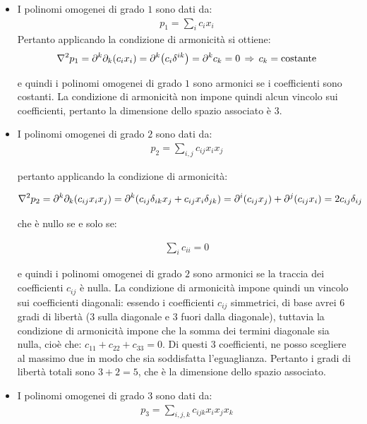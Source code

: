 \begin{itemize}
	\item I polinomi omogenei di grado $1$ sono dati da:
	\begin{align*}
		p_1 = \sum_i c_i x_i
	\end{align*}
		Pertanto applicando la condizione di armonicità si ottiene:
	\begin{align*}
		\nabla^2 p_1 = \partial^k\partial_k \qty(c_i x_i) = \partial^k \qty(c_i \delta^{ik}) = \partial^k c_k = 0 \, \Rightarrow \, c_k = \text{costante}
	\end{align*}

		e quindi i polinomi omogenei di grado $1$ sono armonici se i coefficienti sono costanti. La condizione di armonicità non impone quindi alcun vincolo sui coefficienti, pertanto la dimensione dello spazio associato è $3$.
	
	\item I polinomi omogenei di grado $2$ sono dati da:
	\begin{align*}
		p_2 = \sum_{i,j} c_{ij} x_i x_j 
	\end{align*}	
		
		pertanto applicando la condizione di armonicità:
		
	\begin{align*}
		\nabla^2 p_2 = \partial^k\partial_k \qty(c_{ij} x_i x_j) = \partial^k \qty(c_{ij} \delta_{ik} x_j + c_{ij} x_i \delta_{jk}) = \partial^i \qty(c_{ij} x_j) + \partial^j \qty(c_{ij} x_i) = 2 c_{ij} \delta_{ij}
	\end{align*}
		
		che è nullo se e solo se:
		
	\begin{align*}
		\sum_i c_{ii} = 0
	\end{align*}
	
		e quindi i polinomi omogenei di grado $2$ sono armonici se la traccia dei coefficienti $c_{ij}$ è nulla. La condizione di armonicità impone quindi un vincolo sui coefficienti diagonali: essendo i coefficienti $c_{ij}$ simmetrici, di base avrei $6$ gradi di libertà ($3$ sulla diagonale e $3$ fuori dalla diagonale), tuttavia la condizione di armonicità impone che la somma dei termini diagonale sia nulla, cioè che: $c_{11} + c_{22} + c_{33} = 0$. Di questi $3$ coefficienti, ne posso scegliere al massimo due in modo che sia soddisfatta l'eguaglianza. Pertanto i gradi di libertà totali sono $3 + 2 = 5$, che è la dimensione dello spazio associato.
		
	\item I polinomi omogenei di grado $3$ sono dati da:
	\begin{align*}
		p_3 = \sum_{i,j, k} c_{ijk} x_i x_j x_k
	\end{align*}
		

\end{itemize}

